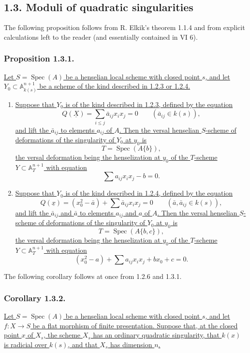 \subsection*{1.3. Moduli of quadratic singularities}

The following proposition follows from R. Elkik's theorem 1.1.4 and
from explicit calculations left to the reader (and essentially
contained in VI 6).

\subsubsection*{Proposition 1.3.1.}
\underline{Let $S=\operatorname{Spec}(A)$ be a henselian local scheme
with closed point $s$, and let
$Y_0\subset\mathbb A_{k(s)}^{n+1}$ be a scheme of the kind described
in 1.2.3 or 1.2.4.}

\begin{enumerate}[label=(\roman*),leftmargin=2.6em]
\item \underline{Suppose that $Y_0$ is of the kind described in
1.2.3, defined by the equation}
\[
Q(\underline X)=\sum_{i\leq j}\bar a_{ij}x_i x_j=0
\qquad(\bar a_{ij}\in k(s)),
\]
\underline{and lift the $\bar a_{ij}$ to elements $a_{ij}$ of $A$.
Then the versal henselian $S$-scheme of deformations of the
singularity of $Y_0$ at $y_0$ is}
\[
T=\operatorname{Spec}(A\{b\}),
\]
\underline{the versal deformation being the henselization at $y_0$
of the $T$-scheme $Y\subset\mathbb A_T^{n+1}$ with equation}
\[
\sum a_{ij}x_i x_j-b=0.
\]

\item \underline{Suppose that $Y_0$ is of the kind described in
1.2.4, defined by the equation}
\[
Q(\underline x)=(x_0^2-\bar a)+\sum\bar a_{ij}x_i x_j=0
\qquad(\bar a,\bar a_{ij}\in k(s)),
\]
\underline{and lift the $\bar a_{ij}$ and $\bar a$ to elements
$a_{ij}$ and $a$ of $A$.  Then the versal henselian $S$-scheme of
deformations of the singularity of $Y_0$ at $y_0$ is}
\[
T=\operatorname{Spec}(A\{b,c\}),
\]
\underline{the versal deformation being the henselization at $y_0$
of the $T$-scheme $Y\subset\mathbb A_T^{n+1}$ with equation}
\[
(x_0^2-a)+\sum a_{ij}x_i x_j+b x_0+c=0.
\]
\end{enumerate}

The following corollary follows at once from 1.2.6 and 1.3.1.

\subsubsection*{Corollary 1.3.2.}
\underline{Let $S=\operatorname{Spec}(A)$ be a henselian local
scheme with closed point $s$, and let $f:X\to S$ be a flat morphism
of finite presentation.  Suppose that, at the closed point $x$ of
$X_s$, the scheme $X_s$ has an ordinary quadratic singularity, that
$k(x)$ is radicial over $k(s)$, and that $X_s$ has dimension $n$.}

